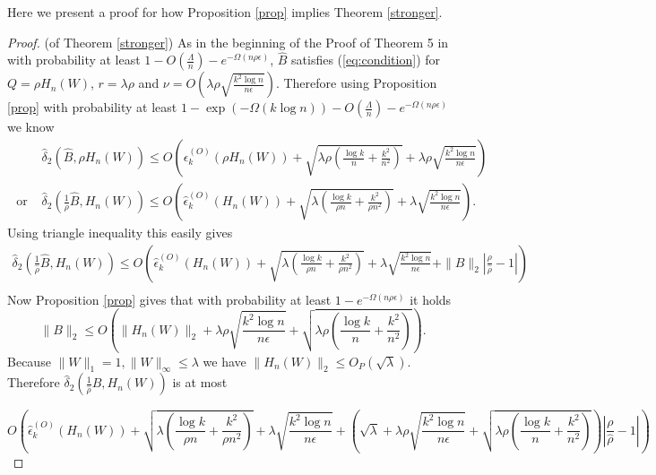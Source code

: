 \documentclass[12pt]{article}
\begin{document}
Here we present a proof for how Proposition \ref{prop} implies Theorem \ref{stronger}.
\begin{proof} (of Theorem \ref{stronger})
As in the beginning of the Proof of Theorem 5 in \cite{Borgs2015} with probability at least $1-O(\frac{\Lambda}{n})-e^{-\Omega(n \rho \epsilon)}$,  $\hat{B}$ satisfies (\ref{eq:condition}) for $Q=\rho H_n( W)$, $r=\lambda \rho$ and $\nu=O\left(\lambda \rho  \sqrt{\frac{k^2\log n}{n \epsilon}}\right)$.
Therefore using Proposition \ref{prop} with probability at least $1-\exp(-\Omega( k\log n))-O(\frac{\Lambda}{n})-e^{-\Omega(n \rho \epsilon)}$ we know
\begin{align*}
&\hat{\delta}_2\left(\hat{B},\rho H_n(W)\right) \leq O\left(\epsilon_k^{(O)}(\rho H_n(W))+\sqrt{\lambda \rho \left(\frac{\log k}{n}+\frac{k^2}{n^2}\right)} + \lambda \rho  \sqrt{\frac{k^2\log n}{n \epsilon}}\right)\\
\text{ or }&  \hat{\delta}_2\left(\frac{1}{\rho}\hat{B}, H_n(W)\right) \leq O\left(\hat{\epsilon}_k^{(O)}(H_n(W))+\sqrt{\lambda  \left(\frac{\log k}{\rho n}+\frac{k^2}{\rho n^2}\right)} + \lambda  \sqrt{\frac{k^2\log n}{n \epsilon}}\right).
\end{align*}
Using triangle inequality this easily gives
\begin{align*}
 \hat{\delta}_2\left(\frac{1}{\hat{\rho}}\hat{B}, H_n(W)\right) \leq O\left(\hat{\epsilon}_k^{(O)}(H_n(W))+\sqrt{\lambda  \left(\frac{\log k}{\rho n}+\frac{k^2}{\rho n^2}\right)} + \lambda  \sqrt{\frac{k^2\log n}{n \epsilon}}+\|B\|_2 |\frac{\rho}{\hat{\rho}}-1|\right)\\
\end{align*}
Now Proposition \ref{prop} gives that with probability at least $1-e^{-\Omega(n \rho \epsilon)}$ it holds  $$\|B\|_2  \leq O( \|H_n(W)\|_2+\lambda \rho \sqrt{\frac{k^2\log n}{n \epsilon}}+\sqrt{\lambda \rho \left(\frac{\log k}{n}+\frac{k^2}{n^2}\right)}  ).$$
Because $\|W\|_1=1,\|W\|_{\infty} \leq \lambda$ we have $\|H_n(W)\|_2 \leq O_P( \sqrt{\lambda})$.  Therefore $\hat{\delta}_2\left(\frac{1}{\hat{\rho}}\hat{B},H_n(W)\right)$ is at most

\begin{equation*}
O\left(\hat{\epsilon}_k^{(O)}( H_n(W))+\sqrt{\lambda  \left(\frac{\log k}{ \rho n}+\frac{k^2}{\rho n^2}\right)} + \lambda  \sqrt{\frac{k^2\log n}{n \epsilon}}+(\sqrt{\lambda}+\lambda \rho \sqrt{\frac{k^2\log n}{n \epsilon}}+\sqrt{\lambda \rho \left(\frac{\log k}{n}+\frac{k^2}{n^2}\right)} ) | \frac{\rho}{\hat{\rho}}-1|\right)
\end{equation*}


\end{proof}
\end{document}
